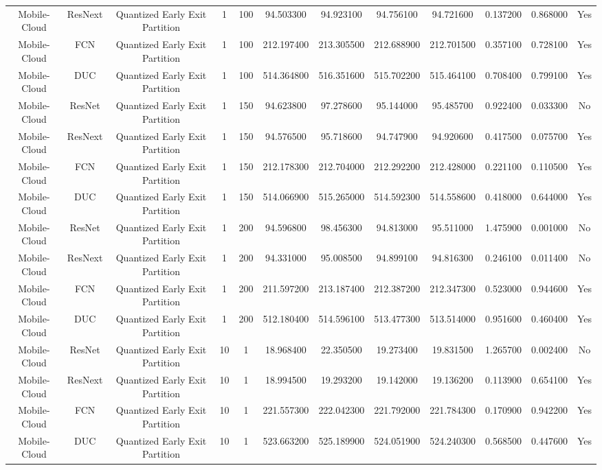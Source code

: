 \begin{tabular}{|c||c||c||c||c||c||c||c||c||c||c||c|}
Mobile-Cloud & ResNext & Quantized Early Exit Partition & 1 & 100 & 94.503300 & 94.923100 & 94.756100 & 94.721600 & 0.137200 & 0.868000 & Yes \\
Mobile-Cloud & FCN & Quantized Early Exit Partition & 1 & 100 & 212.197400 & 213.305500 & 212.688900 & 212.701500 & 0.357100 & 0.728100 & Yes \\
Mobile-Cloud & DUC & Quantized Early Exit Partition & 1 & 100 & 514.364800 & 516.351600 & 515.702200 & 515.464100 & 0.708400 & 0.799100 & Yes \\
Mobile-Cloud & ResNet & Quantized Early Exit Partition & 1 & 150 & 94.623800 & 97.278600 & 95.144000 & 95.485700 & 0.922400 & 0.033300 & No \\
Mobile-Cloud & ResNext & Quantized Early Exit Partition & 1 & 150 & 94.576500 & 95.718600 & 94.747900 & 94.920600 & 0.417500 & 0.075700 & Yes \\
Mobile-Cloud & FCN & Quantized Early Exit Partition & 1 & 150 & 212.178300 & 212.704000 & 212.292200 & 212.428000 & 0.221100 & 0.110500 & Yes \\
Mobile-Cloud & DUC & Quantized Early Exit Partition & 1 & 150 & 514.066900 & 515.265000 & 514.592300 & 514.558600 & 0.418000 & 0.644000 & Yes \\
Mobile-Cloud & ResNet & Quantized Early Exit Partition & 1 & 200 & 94.596800 & 98.456300 & 94.813000 & 95.511000 & 1.475900 & 0.001000 & No \\
Mobile-Cloud & ResNext & Quantized Early Exit Partition & 1 & 200 & 94.331000 & 95.008500 & 94.899100 & 94.816300 & 0.246100 & 0.011400 & No \\
Mobile-Cloud & FCN & Quantized Early Exit Partition & 1 & 200 & 211.597200 & 213.187400 & 212.387200 & 212.347300 & 0.523000 & 0.944600 & Yes \\
Mobile-Cloud & DUC & Quantized Early Exit Partition & 1 & 200 & 512.180400 & 514.596100 & 513.477300 & 513.514000 & 0.951600 & 0.460400 & Yes \\
Mobile-Cloud & ResNet & Quantized Early Exit Partition & 10 & 1 & 18.968400 & 22.350500 & 19.273400 & 19.831500 & 1.265700 & 0.002400 & No \\
Mobile-Cloud & ResNext & Quantized Early Exit Partition & 10 & 1 & 18.994500 & 19.293200 & 19.142000 & 19.136200 & 0.113900 & 0.654100 & Yes \\
Mobile-Cloud & FCN & Quantized Early Exit Partition & 10 & 1 & 221.557300 & 222.042300 & 221.792000 & 221.784300 & 0.170900 & 0.942200 & Yes \\
Mobile-Cloud & DUC & Quantized Early Exit Partition & 10 & 1 & 523.663200 & 525.189900 & 524.051900 & 524.240300 & 0.568500 & 0.447600 & Yes \\

\end{tabular}
